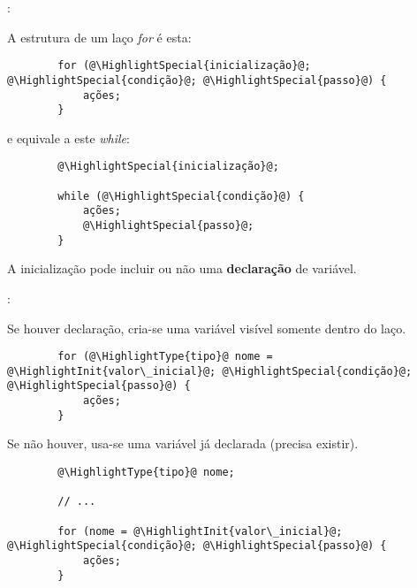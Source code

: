 \begin{frame}[fragile]{\insertsection: \insertsubsection}

	A estrutura de um laço \textit{for} é esta:
	\begin{verbatim}
		for (@\HighlightSpecial{inicialização}@; @\HighlightSpecial{condição}@; @\HighlightSpecial{passo}@) {
			ações;
		}
	\end{verbatim}
	e equivale a este \textit{while}:
	\begin{verbatim}
		@\HighlightSpecial{inicialização}@;

		while (@\HighlightSpecial{condição}@) {
			ações;
			@\HighlightSpecial{passo}@;
		}
	\end{verbatim}

	A inicialização pode incluir ou não uma \textbf{declaração} de variável.

\end{frame}


\begin{frame}[fragile]{\insertsection: \insertsubsection}

	Se houver declaração, cria-se uma variável visível somente dentro do laço.
	\begin{verbatim}
		for (@\HighlightType{tipo}@ nome = @\HighlightInit{valor\_inicial}@; @\HighlightSpecial{condição}@; @\HighlightSpecial{passo}@) {
			ações;
		}
	\end{verbatim}

	Se não houver, usa-se uma variável já declarada (precisa existir).
	\begin{verbatim}
		@\HighlightType{tipo}@ nome;

		// ...

		for (nome = @\HighlightInit{valor\_inicial}@; @\HighlightSpecial{condição}@; @\HighlightSpecial{passo}@) {
			ações;
		}
	\end{verbatim}

\end{frame}



